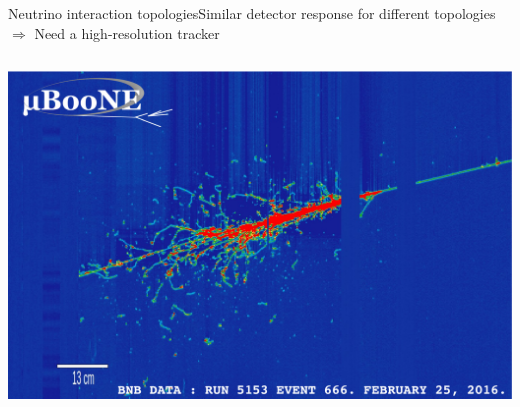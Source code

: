\documentclass[]{beamer}
\newcommand*{\emphcoltitle}{blue}
\begin{document}
\begin{frame}{Neutrino interaction topologies}{Similar detector response for different topologies $\Rightarrow$ {\color{\emphcoltitle} Need a high-resolution tracker}}
\begin{columns}[c]
		\includegraphics[width=\textwidth]{defence/uboone_em-shower}
	\end{columns}
\end{frame}
\end{document}
